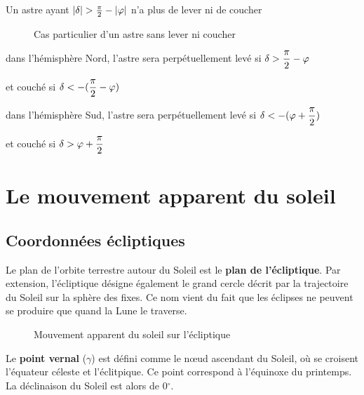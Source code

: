 \documentclass[12pt]{report}
\begin{document}
Un astre ayant $|\delta| > {\pi\over 2} - |\varphi|$ n'a plus de lever ni de coucher

\begin{figure}[ht]
\begin{center}
\end{center}
\caption{Cas particulier d'un astre sans lever ni coucher}
\label{fig:20}
\end{figure}



dans l'hémisphère Nord, l'astre sera perpétuellement levé si $\delta > \displaystyle {\pi\over 2} - \varphi$ 

\medskip

\hspace*{85mm} et couché si $\delta < - \displaystyle ({\pi\over 2}-\varphi)$


\bigskip

dans l'hémisphère Sud, l'astre sera perpétuellement levé si $\delta < - \displaystyle (\varphi + {\pi\over 2})$ 

\medskip

\hspace*{83mm} et couché si $\delta >  \displaystyle \varphi + {\pi\over 2}$


\chapter{Le mouvement apparent du soleil}


\section{{Coordonnées écliptiques}} 
Le plan de l'orbite terrestre autour du Soleil est le \textbf{plan de l'écliptique}. Par extension, l'écliptique désigne également le grand cercle décrit par la trajectoire du Soleil sur la sphère des fixes.  Ce nom vient du fait que les éclipses ne peuvent se produire que quand la Lune le traverse.

\begin{figure}[ht]
\begin{center}
\end{center}
\caption{Mouvement apparent du soleil sur l'écliptique}
\label{fig:21}
\end{figure}

\bigskip


Le \textbf{point vernal} ($\gamma$) est défini comme le n\oe ud ascendant du Soleil, où se croisent l'équateur céleste et l'éclitpique. Ce point correspond à l'équinoxe du printemps. La déclinaison du Soleil est alors de 0$^\circ$. 
\end{document}
